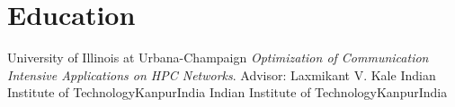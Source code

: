 \section{Education}
		{University of Illinois at Urbana-Champaign}{}{}
		{%
		  \textit{Optimization of Communication Intensive Applications on HPC
      Networks}. Advisor: Laxmikant V. Kale
		}
		{Indian Institute of Technology}{Kanpur}{India}{}
		{Indian Institute of Technology}{Kanpur}{India}{}

